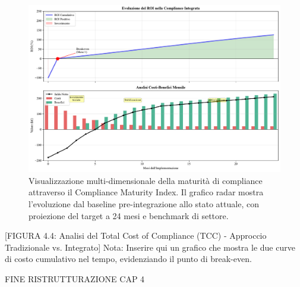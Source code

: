 \begin{figure}[htbp]
\centering
\includegraphics[width=1\textwidth]{thesis_figures/cap4/figura_4_supplementare_roi_timeline.pdf}
\caption{Visualizzazione multi-dimensionale della maturità di compliance attraverso il Compliance Maturity Index. Il grafico radar mostra l'evoluzione dal baseline pre-integrazione allo stato attuale, con proiezione del target a 24 mesi e benchmark di settore.}
\label{fig:supplementare_roi_timeline}
\end{figure}

[FIGURA 4.4: Analisi del Total Cost of Compliance (TCC) - Approccio Tradizionale vs. Integrato]
Nota: Inserire qui un grafico che mostra le due curve di costo cumulativo nel tempo, evidenziando il punto di break-even.

\printbibliography[
    heading=subbibliography, %
    title={Riferimenti Bibliografici del Capitolo 2}, %
    
]

\endrefsection %


FINE RISTRUTTURAZIONE CAP 4


